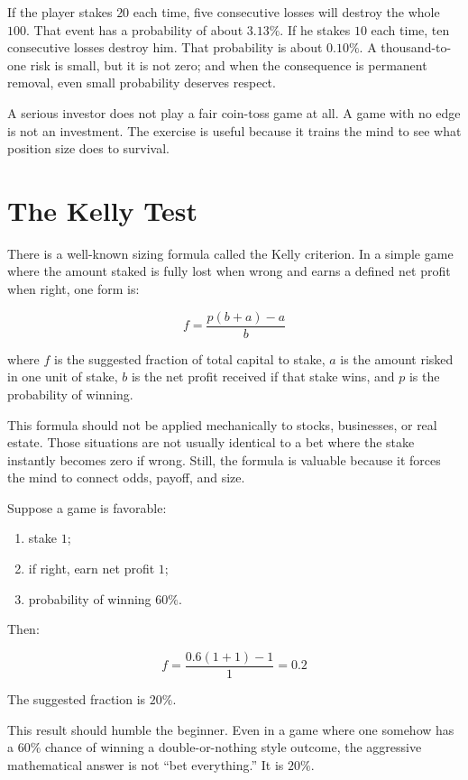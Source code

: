If the player stakes \(20\) each time, five consecutive losses will destroy the whole \(100\). That event has a probability of about \(3.13\%\). If he stakes \(10\) each time, ten consecutive losses destroy him. That probability is about \(0.10\%\). A thousand-to-one risk is small, but it is not zero; and when the consequence is permanent removal, even small probability deserves respect.

A serious investor does not play a fair coin-toss game at all. A game with no edge is not an investment. The exercise is useful because it trains the mind to see what position size does to survival.

\section*{The Kelly Test}

There is a well-known sizing formula called the Kelly criterion. In a simple game where the amount staked is fully lost when wrong and earns a defined net profit when right, one form is:

\[
f=\frac{p(b+a)-a}{b}
\]

where \(f\) is the suggested fraction of total capital to stake, \(a\) is the amount risked in one unit of stake, \(b\) is the net profit received if that stake wins, and \(p\) is the probability of winning.

This formula should not be applied mechanically to stocks, businesses, or real estate. Those situations are not usually identical to a bet where the stake instantly becomes zero if wrong. Still, the formula is valuable because it forces the mind to connect odds, payoff, and size.

Suppose a game is favorable:

\begin{enumerate}
\item stake \(1\);
\item if right, earn net profit \(1\);
\item probability of winning \(60\%\).
\end{enumerate}

Then:

\[
f=\frac{0.6(1+1)-1}{1}=0.2
\]

The suggested fraction is \(20\%\).

This result should humble the beginner. Even in a game where one somehow has a \(60\%\) chance of winning a double-or-nothing style outcome, the aggressive mathematical answer is not ``bet everything.'' It is \(20\%\).

